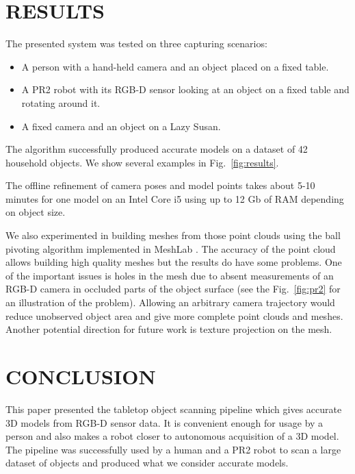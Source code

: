 \documentclass[letterpaper, 10 pt, conference]{ieeeconf}  %
\begin{document}
\section{RESULTS}

\label{sec:experiments}

The presented system was tested on three capturing scenarios:

\begin{itemize}
 \item A person with a hand-held camera and an object placed on a fixed table.
 \item A PR2 robot with its RGB-D sensor looking at an object on a fixed table and rotating around it.
 \item A fixed camera and an object on a Lazy Susan.
\end{itemize}

The algorithm successfully produced accurate models 
on a dataset of 42 household objects. We show several examples in Fig.~\ref{fig:results}.

The offline refinement of camera poses 
and model points takes about 5-10 minutes for one model on an Intel Core i5 using up to 12 Gb of RAM
depending on object size.

We also experimented in building meshes from those point clouds using 
the ball pivoting algorithm \cite{bernardini1999ball}
implemented in MeshLab \cite{meshlab}. The accuracy of 
the point cloud allows building high quality meshes but the results do have some problems. One of the important issues 
is holes in 
the mesh due to absent measurements of an RGB-D camera in occluded parts of the object surface 
(see the Fig.~\ref{fig:pr2} for an illustration of the problem).
Allowing an arbitrary camera 
trajectory would reduce unobserved object area and give more complete
point clouds and meshes. Another potential direction for future work is texture projection on the mesh.


\section{CONCLUSION}

This paper presented the tabletop object scanning pipeline
which gives accurate 3D models from RGB-D sensor data.
It is convenient enough for usage by a person and also makes a robot closer
to autonomous acquisition of a 3D model. The pipeline 
was successfully used by a human and a PR2 robot 
to scan a large dataset of objects and produced what we consider
accurate models.
\end{document}

